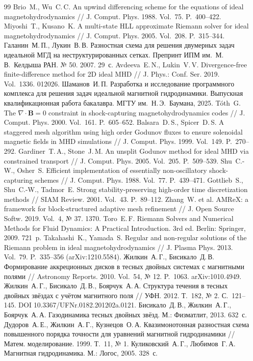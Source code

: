 \documentclass[12pt,a4paper]{article}
\newcommand{\B}{\mathbf{B}}
\begin{document}
\begin{thebibliography}{99}
 Brio~M., Wu~C.\,C. An upwind differencing scheme for the
equations of ideal magnetohydrodynamics // J. Comput. Phys. 1988. Vol.~75.
P.~400--422.
 Miyoshi~T., Kusano~K. A multi-state HLL approximate
Riemann solver for ideal magnetohydrodynamics // J. Comput. Phys. 2005.
Vol.~208. P.~315--344.
 Галанин~М.\,П., Лукин~В.\,В. Разностная схема для решения
двумерных задач идеальной МГД на неструктурированных сетках. Препринт ИПМ
им.~М.\,В.~Келдыша РАН. № 50. 2007. 29~с.
 Avdeeva~E.\,N., Lukin~V.\,V. Divergence-free
finite-difference method for 2D ideal MHD // J. Phys.: Conf. Ser. 2019.
Vol.~1336. 012026.
 Шаманов~И.\,П. Разработка и исследование программного
комплекса для решения задач идеальной магнитной гидродинамики. Выпускная
квалификационная работа бакалавра. МГТУ им.~Н.\,Э.~Баумана, 2025.
 T\'oth~G. The $\nabla\!\cdot\!\B=0$ constraint in
shock-capturing magnetohydrodynamics codes // J. Comput. Phys. 2000. Vol.~161.
P.~605--652.
 Balsara~D.\,S., Spicer~D.\,S. A staggered mesh algorithm
using high order Godunov fluxes to ensure solenoidal magnetic fields in MHD
simulations // J. Comput. Phys. 1999. Vol.~149. P.~270--292.
 Gardiner~T.\,A., Stone~J.\,M. An unsplit Godunov method
for ideal MHD via constrained transport // J. Comput. Phys. 2005. Vol.~205.
P.~509--539.
 Shu~C.-W., Osher~S. Efficient implementation of essentially
non-oscillatory shock-capturing schemes // J. Comput. Phys. 1988. Vol.~77.
P.~439--471.
 Gottlieb~S., Shu~C.-W., Tadmor~E. Strong
stability-preserving high-order time discretization methods // SIAM Review.
2001. Vol.~43. P.~89--112.
 Zhang~W. et al. AMReX: a framework for block-structured
adaptive mesh refinement // J. Open Source Softw. 2019. Vol.~4, № 37. 1370.
 Toro~E.\,F. Riemann Solvers and Numerical Methods for Fluid
Dynamics: A Practical Introduction. 3rd ed. Berlin: Springer, 2009. 721~p.
 Takahashi~K., Yamada~S. Regular and non-regular
solutions of the Riemann problem in ideal magnetohydrodynamics //
J. Plasma Phys. 2013. Vol.~79. P.~335--356 (arXiv:1210.5584).
 Жилкин~А.\,Г., Бисикало~Д.\,В. Формирование аккреционных
дисков в тесных двойных системах с магнитными полями // Astronomy Reports. 2010.
Vol.~54, № 12. P.~1063. arXiv:1010.4949.
 Жилкин~А.\,Г., Бисикало~Д.\,В., Боярчук~А.\,А. Структура
течения в тесных двойных звёздах с учётом магнитного поля // УФН. 2012. Т.~182,
№ 2. С.~121--145. DOI 10.3367/UFNr.0182.201202a.0121.
 Бисикало~Д.\,В., Жилкин~А.\,Г., Боярчук~А.\,А.
Газодинамика тесных двойных звёзд. М.: Физматлит, 2013. 632~с.
 Дудоров~А.\,Е., Жилкин~А.\,Г., Кузнецов~О.\,А.
Квазимонотонная разностная схема повышенного порядка точности для уравнений
магнитной гидродинамики // Матем. моделирование. 1999. Т.~11, № 1.
 Куликовский~А.\,Г., Любимов~Г.\,А. Магнитная
гидродинамика. М.: Логос, 2005. 328~с.
\end{thebibliography}
\end{document}
